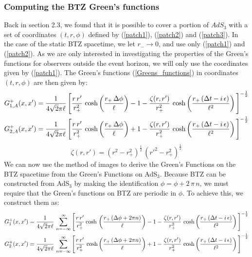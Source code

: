 \subsubsection{Computing the BTZ Green's functions}
Back in section 2.3, we found that it is possible to cover a portion of $AdS_3$ with a set of coordinates $(t,r,\phi)$ defined by (\ref{patch1}), (\ref{patch2}) and (\ref{patch3}). In the case of the static BTZ spacetime, we let $r_- \to 0$, and use only (\ref{patch1}) and (\ref{patch2}). As we are only interested in investigating the properties of the Green's functions for observers outside the event horizon, we will only use the coordinates given by (\ref{patch1}). The Green's functions (\ref{Greens_functions}) in coordinates $(t,r,\phi)$ are then given by:
%
%
\begin{align}
G^+_{1,A}(x,x') = \frac{1}{4 \sqrt{2} \pi \ell} \, \Bigg[
&\frac{r \, r'}{r_+^2} \, \cosh \left(
\frac{r_+ \, \Delta \phi}{\ell}
\right) - 1 - \frac{\zeta(r,r')}{r_+^2} \, \cosh \left(
\frac{r_+ \, (\Delta t - i \, \epsilon)}{\ell^2}
\right)
\Bigg]^{-\frac{1}{2}}
%
\notag\\
%
G^+_{2,A}(x,x') = \frac{1}{4 \sqrt{2} \pi \ell} \, \Bigg[
&\frac{r \, r'}{r_+^2} \, \cosh \left(
\frac{r_+ \, \Delta \phi}{\ell}
\right) + 1 - \frac{\zeta(r,r')}{r_+^2} \, \cosh \left(
\frac{r_+ \, (\Delta t - i \, \epsilon)}{\ell^2}
\right)
\Bigg]^{-\frac{1}{2}} \label{Green_pm}
\end{align}
%
\begin{equation*}
\zeta(r,r') = (r^2 - r_+^2)^\frac{1}{2} \, (r'^2 - r_+^2)^\frac{1}{2}
\end{equation*}
%
%
We can now use the method of images to derive the Green's Functions on the BTZ spacetime from the Green's Functions on AdS$_3$. Because BTZ can be constructed from AdS$_3$ by making the identification $\phi = \phi + 2 \, \pi \, n$, we must require that the Green's functions on BTZ are periodic in $\phi$. To achieve this, we construct them as:
%
\begin{align}
G^+_1(x,x') = \frac{1}{4 \sqrt{2} \pi \ell} \, \sum_{n=-\infty}^\infty \Bigg[
&\frac{r \, r'}{r_+^2} \cosh \, \left(
\frac{r_+ \, (\Delta \phi + 2 \pi n)}{\ell}
\right) - 1 - \frac{\zeta(r,r')}{r_+^2} \, \cosh \left(
\frac{r_+ \, (\Delta t - i \, \epsilon)}{\ell^2}
\right)
\Bigg]^{-\frac{1}{2}}
\notag\\
G^+_2(x,x') = \frac{1}{4 \sqrt{2} \pi \ell} \, \sum_{n=-\infty}^\infty \Bigg[
&\frac{r \, r'}{r_+^2} \, \cosh \left(
\frac{r_+ \, (\Delta \phi + 2 \pi n)}{\ell}
\right) + 1 - \frac{\zeta(r,r')}{r_+^2} \, \cosh \left(
\frac{r_+ \, (\Delta t - i \, \epsilon)}{\ell^2}
\right)
\Bigg]^{-\frac{1}{2}} \label{Green_pm_thermal}
\end{align}
%

